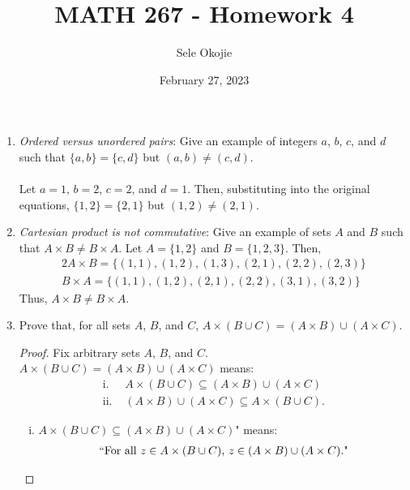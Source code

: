 \documentclass{article}
\title{MATH 267 - Homework 4}
\author{Sele Okojie}
\date{February 27, 2023}
\begin{document}
    \maketitle

    \begin{enumerate}
    
	\item \emph{Ordered versus unordered pairs}: Give an example of integers $a$, $b$, $c$, and $d$ such that $\{ a, b \} = \{ c, d \}$ but $(a,b) \neq (c,d)$.\\\\
            Let $a = 1$, $b = 2$, $c = 2$, and $d = 1$. Then, substituting into the original equations, $\{ 1, 2 \} = \{ 2, 1 \}$ but $(1,2) \neq (2,1)$.
        
	\item \emph{Cartesian product is not commutative}: Give an example of sets $A$ and $B$ such that $A \times B \neq B \times A$.
            Let $A = \{ 1, 2 \}$ and $B = \{ 1, 2, 3 \}$. Then,
            \begin{alignat*}{2}
                A \times B = \{ (1, 1), (1, 2), (1, 3), (2, 1), (2, 2), (2, 3) \} \\
                B \times A = \{ (1, 1), (1, 2), (2, 1), (2, 2), (3, 1), (3, 2) \}
            \end{alignat*}
            Thus, $A \times B \neq B \times A$.
	
        \item Prove that, for all sets $A$, $B$, and $C$, $A \times (B \cup C) = (A \times B) \cup (A \times C)$.
            \begin{proof}
                Fix arbitrary sets $A$, $B$, and $C$. $A \times (B \cup C) = (A \times B) \cup (A \times C)$ means: 
                    \begin{align*}
                        \text{i. } &A \times (B \cup C) \subseteq (A \times B) \cup (A \times C) \\
                        \text{ii. } &(A \times B) \cup (A \times C) \subseteq A \times (B \cup C).
                    \end{align*}
                    
                \begin{enumerate}[i.]
                    \item \lQuote $A \times (B \cup C) \subseteq (A \times B) \cup (A \times C)$" means:
                        \begin{align*}
                            `` \text{For all } z \in A \times (B \cup C)\text{, } z \in (A \times B) \cup (A \times C)\text{."}
                        \end{align*}
                        

\end{enumerate}
\end{proof}
\end{enumerate}
\end{document}
